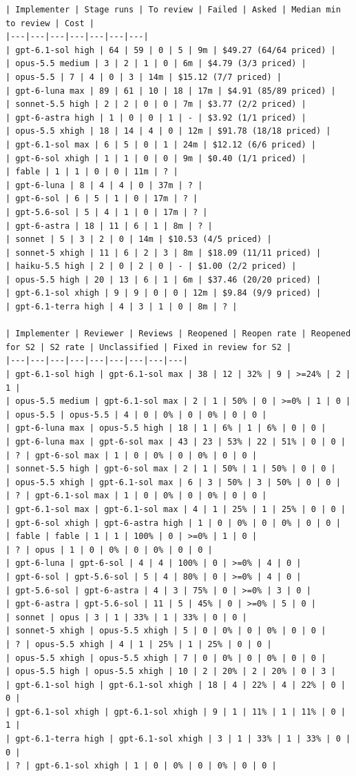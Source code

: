 \documentclass[11pt,a4paper]{article}
\begin{document}
{\tiny
\begin{verbatim}
| Implementer | Stage runs | To review | Failed | Asked | Median min to review | Cost |
|---|---|---|---|---|---|---|
| gpt-6.1-sol high | 64 | 59 | 0 | 5 | 9m | $49.27 (64/64 priced) |
| opus-5.5 medium | 3 | 2 | 1 | 0 | 6m | $4.79 (3/3 priced) |
| opus-5.5 | 7 | 4 | 0 | 3 | 14m | $15.12 (7/7 priced) |
| gpt-6-luna max | 89 | 61 | 10 | 18 | 17m | $4.91 (85/89 priced) |
| sonnet-5.5 high | 2 | 2 | 0 | 0 | 7m | $3.77 (2/2 priced) |
| gpt-6-astra high | 1 | 0 | 0 | 1 | - | $3.92 (1/1 priced) |
| opus-5.5 xhigh | 18 | 14 | 4 | 0 | 12m | $91.78 (18/18 priced) |
| gpt-6.1-sol max | 6 | 5 | 0 | 1 | 24m | $12.12 (6/6 priced) |
| gpt-6-sol xhigh | 1 | 1 | 0 | 0 | 9m | $0.40 (1/1 priced) |
| fable | 1 | 1 | 0 | 0 | 11m | ? |
| gpt-6-luna | 8 | 4 | 4 | 0 | 37m | ? |
| gpt-6-sol | 6 | 5 | 1 | 0 | 17m | ? |
| gpt-5.6-sol | 5 | 4 | 1 | 0 | 17m | ? |
| gpt-6-astra | 18 | 11 | 6 | 1 | 8m | ? |
| sonnet | 5 | 3 | 2 | 0 | 14m | $10.53 (4/5 priced) |
| sonnet-5 xhigh | 11 | 6 | 2 | 3 | 8m | $18.09 (11/11 priced) |
| haiku-5.5 high | 2 | 0 | 2 | 0 | - | $1.00 (2/2 priced) |
| opus-5.5 high | 20 | 13 | 6 | 1 | 6m | $37.46 (20/20 priced) |
| gpt-6.1-sol xhigh | 9 | 9 | 0 | 0 | 12m | $9.84 (9/9 priced) |
| gpt-6.1-terra high | 4 | 3 | 1 | 0 | 8m | ? |

| Implementer | Reviewer | Reviews | Reopened | Reopen rate | Reopened for S2 | S2 rate | Unclassified | Fixed in review for S2 |
|---|---|---|---|---|---|---|---|---|
| gpt-6.1-sol high | gpt-6.1-sol max | 38 | 12 | 32% | 9 | >=24% | 2 | 1 |
| opus-5.5 medium | gpt-6.1-sol max | 2 | 1 | 50% | 0 | >=0% | 1 | 0 |
| opus-5.5 | opus-5.5 | 4 | 0 | 0% | 0 | 0% | 0 | 0 |
| gpt-6-luna max | opus-5.5 high | 18 | 1 | 6% | 1 | 6% | 0 | 0 |
| gpt-6-luna max | gpt-6-sol max | 43 | 23 | 53% | 22 | 51% | 0 | 0 |
| ? | gpt-6-sol max | 1 | 0 | 0% | 0 | 0% | 0 | 0 |
| sonnet-5.5 high | gpt-6-sol max | 2 | 1 | 50% | 1 | 50% | 0 | 0 |
| opus-5.5 xhigh | gpt-6.1-sol max | 6 | 3 | 50% | 3 | 50% | 0 | 0 |
| ? | gpt-6.1-sol max | 1 | 0 | 0% | 0 | 0% | 0 | 0 |
| gpt-6.1-sol max | gpt-6.1-sol max | 4 | 1 | 25% | 1 | 25% | 0 | 0 |
| gpt-6-sol xhigh | gpt-6-astra high | 1 | 0 | 0% | 0 | 0% | 0 | 0 |
| fable | fable | 1 | 1 | 100% | 0 | >=0% | 1 | 0 |
| ? | opus | 1 | 0 | 0% | 0 | 0% | 0 | 0 |
| gpt-6-luna | gpt-6-sol | 4 | 4 | 100% | 0 | >=0% | 4 | 0 |
| gpt-6-sol | gpt-5.6-sol | 5 | 4 | 80% | 0 | >=0% | 4 | 0 |
| gpt-5.6-sol | gpt-6-astra | 4 | 3 | 75% | 0 | >=0% | 3 | 0 |
| gpt-6-astra | gpt-5.6-sol | 11 | 5 | 45% | 0 | >=0% | 5 | 0 |
| sonnet | opus | 3 | 1 | 33% | 1 | 33% | 0 | 0 |
| sonnet-5 xhigh | opus-5.5 xhigh | 5 | 0 | 0% | 0 | 0% | 0 | 0 |
| ? | opus-5.5 xhigh | 4 | 1 | 25% | 1 | 25% | 0 | 0 |
| opus-5.5 xhigh | opus-5.5 xhigh | 7 | 0 | 0% | 0 | 0% | 0 | 0 |
| opus-5.5 high | opus-5.5 xhigh | 10 | 2 | 20% | 2 | 20% | 0 | 3 |
| gpt-6.1-sol high | gpt-6.1-sol xhigh | 18 | 4 | 22% | 4 | 22% | 0 | 0 |
| gpt-6.1-sol xhigh | gpt-6.1-sol xhigh | 9 | 1 | 11% | 1 | 11% | 0 | 1 |
| gpt-6.1-terra high | gpt-6.1-sol xhigh | 3 | 1 | 33% | 1 | 33% | 0 | 0 |
| ? | gpt-6.1-sol xhigh | 1 | 0 | 0% | 0 | 0% | 0 | 0 |


\end{verbatim}}
\end{document}
